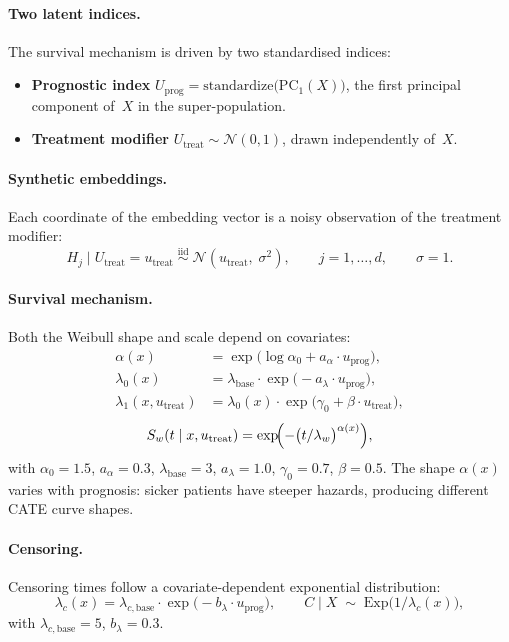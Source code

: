 \documentclass{article}
\begin{document}
\paragraph{Two latent indices.}
The survival mechanism is driven by two standardised indices:
\begin{itemize}
  \item \textbf{Prognostic index} $U_{\mathrm{prog}} = \mathrm{standardize}\!\bigl(\mathrm{PC}_1(X)\bigr)$, the first principal component of~$X$ in the super-population.
  \item \textbf{Treatment modifier} $U_{\mathrm{treat}} \sim \mathcal{N}(0,1)$, drawn independently of~$X$.
\end{itemize}

\paragraph{Synthetic embeddings.}
Each coordinate of the embedding vector is a noisy observation of the treatment modifier:
\[
  H_j \mid U_{\mathrm{treat}} = u_{\mathrm{treat}} \;\overset{\mathrm{iid}}{\sim}\; \mathcal{N}(u_{\mathrm{treat}},\; \sigma^2),
  \qquad j = 1, \dots, d, \qquad \sigma = 1.
\]

\paragraph{Survival mechanism.}
Both the Weibull shape and scale depend on covariates:
\begin{align*}
  \alpha(x) &= \exp\!\bigl(\log \alpha_0 + a_\alpha \cdot u_{\mathrm{prog}}\bigr), \\
  \lambda_0(x) &= \lambda_{\mathrm{base}} \cdot \exp\!\bigl(-a_\lambda \cdot u_{\mathrm{prog}}\bigr), \\
  \lambda_1(x, u_{\mathrm{treat}}) &= \lambda_0(x) \cdot \exp\!\bigl(\gamma_0 + \beta \cdot u_{\mathrm{treat}}\bigr),
\end{align*}
\[
  S_w(t \mid x, u_{\mathrm{treat}}) = \exp\!\Bigl(-\bigl(t / \lambda_w\bigr)^{\alpha(x)}\Bigr),
\]
with $\alpha_0 = 1.5$, $a_\alpha = 0.3$, $\lambda_{\mathrm{base}} = 3$, $a_\lambda = 1.0$, $\gamma_0 = 0.7$, $\beta = 0.5$.
The shape $\alpha(x)$ varies with prognosis: sicker patients have steeper hazards, producing different CATE curve shapes.

\paragraph{Censoring.}
Censoring times follow a covariate-dependent exponential distribution:
\[
  \lambda_c(x) = \lambda_{c,\mathrm{base}} \cdot \exp\!\bigl(-b_\lambda \cdot u_{\mathrm{prog}}\bigr),
  \qquad
  C \mid X \;\sim\; \mathrm{Exp}\bigl(1/\lambda_c(x)\bigr),
\]
with $\lambda_{c,\mathrm{base}} = 5$, $b_\lambda = 0.3$.
\end{document}

